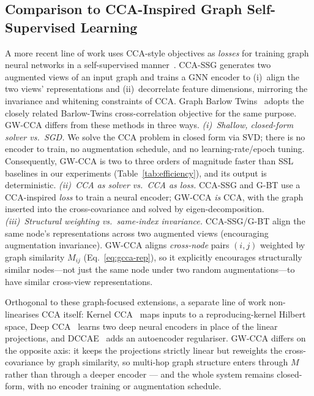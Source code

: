 \documentclass{article}
\begin{document}
\subsection{Comparison to CCA-Inspired Graph Self-Supervised Learning}
\label{sec:approach:ssl}
A more recent line of work uses CCA-style objectives as \emph{losses} for
training graph neural networks in a self-supervised
manner~\citep{zhang2021ccassg,bielak2022graphbt}. CCA-SSG
\citep{zhang2021ccassg} generates two augmented views of an input graph and
trains a GNN encoder to (i)~align the two views' representations and
(ii)~decorrelate feature dimensions, mirroring the invariance and whitening
constraints of CCA. Graph Barlow Twins~\citep{bielak2022graphbt} adopts the
closely related Barlow-Twins cross-correlation objective for the same
purpose. GW-CCA differs from these methods in three ways.
\emph{(i)~Shallow, closed-form solver vs.\ SGD.} We solve the CCA
problem in closed form via SVD; there is no encoder to train,
no augmentation schedule, and no learning-rate/epoch tuning. Consequently,
GW-CCA is two to three orders of magnitude faster than SSL baselines in our
experiments (Table~\ref{tab:efficiency}), and its output is deterministic.
\emph{(ii)~CCA as solver vs.\ CCA as loss.} CCA-SSG and G-BT use a
CCA-inspired \emph{loss} to train a neural encoder; GW-CCA \emph{is} CCA,
with the graph inserted into the cross-covariance and solved by
eigen-decomposition. \emph{(iii)~Structural weighting vs.\ same-index
invariance.} CCA-SSG/G-BT align the same node's representations across two
augmented views (encouraging augmentation invariance). GW-CCA aligns
\emph{cross-node} pairs $(i,j)$ weighted by graph similarity $M_{ij}$
(Eq.~\ref{eq:gcca-rep}), so it explicitly encourages structurally similar
nodes---not just the same node under two random augmentations---to have
similar cross-view representations.

Orthogonal to these graph-focused extensions, a separate line of work
non-linearises CCA itself: Kernel CCA~\citep{hardoon2004canonical} maps
inputs to a reproducing-kernel Hilbert space, Deep
CCA~\citep{andrew2013deep} learns two deep neural encoders in place of the
linear projections, and DCCAE~\citep{wang2015deep} adds an autoencoder
regulariser. GW-CCA differs on the opposite axis: it keeps the projections
strictly linear but reweights the cross-covariance by graph similarity, so
multi-hop graph structure enters through $M$ rather than through a deeper
encoder --- and the whole system remains closed-form, with no encoder
training or augmentation schedule.
\end{document}
